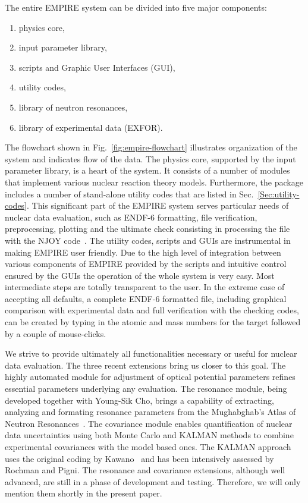 \documentclass[twocolumn,amsmath,amssymb,10pt,groupedaddress,letter]{revtex4}
\begin{document}
The entire EMPIRE system can be divided into five major components:
\begin{enumerate}
\item physics core,
\item input parameter library,
\item scripts and Graphic User Interfaces (GUI),
\item utility codes,
\item library of neutron resonances,
\item library of experimental data (EXFOR).
\end{enumerate}
The flowchart shown in Fig.~\ref{fig:empire-flowchart} illustrates organization of the system and indicates flow of the data. The physics core, supported by the input parameter library, is a heart of the system. It consists of a number of modules that implement various nuclear reaction theory models. Furthermore, the package includes a number of stand-alone utility codes that are listed in Sec.~\ref{Sec:utility-codes}. This significant part of the EMPIRE system serves particular needs of nuclear data evaluation, such as ENDF-6 formatting, file verification, preprocessing, plotting and the ultimate check consisting in processing the file with the NJOY code~\cite{MacFarlane:06,MacFarlane:94}. The utility codes, scripts and GUIs are instrumental in making EMPIRE user friendly. Due to the high level of integration between various components of EMPIRE provided by the scripts and intuitive control ensured by the GUIs the operation of the whole system is very easy.  Most intermediate steps are totally transparent to the user.  In the extreme case of accepting all defaults, a complete ENDF-6 formatted file, including graphical comparison with experimental data and full verification with the checking codes, can be created by typing in the atomic and mass numbers for the target followed by a couple of mouse-clicks.


We strive to provide ultimately all functionalities necessary or useful for nuclear data evaluation. The three recent extensions bring us closer to this goal.  The highly automated module for adjustment of optical potential parameters refines essential parameters underlying any evaluation. The resonance module, being developed together with Young-Sik Cho, brings a capability of extracting, analyzing and formating resonance parameters from the Mughabghab's Atlas of Neutron Resonances~\cite{Mughabghab:06}. The covariance module enables quantification of nuclear data uncertainties using both Monte Carlo and KALMAN methods to combine experimental covariances with the model based ones. The KALMAN approach uses the original coding by Kawano~\cite{Kawano:97} and has been intensively assessed by Rochman and Pigni. The resonance and covariance extensions, although well advanced, are still in a phase of development and testing. Therefore, we will only mention them shortly in the present paper.
\end{document}

